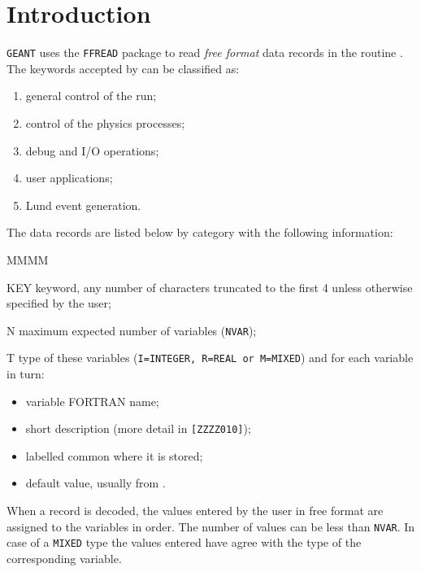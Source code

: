                
\section{ Introduction }
 
{\tt GEANT} uses the {\tt FFREAD} \cite{bib-FFREAD}
package to read {\it free format} data records in the routine .
The keywords accepted by  can be
classified as:
\begin{enumerate}
\item         general control of the run;
\item         control of the physics processes;
\item         debug and I/O operations;
\item         user applications;
\item         Lund event generation.
\end{enumerate}
 
The data records are listed below by category with the following information:
\begin{DLtt}{MMMM}
\item[KEY] keyword, any number of characters
truncated to the first 4 unless otherwise specified by the user;
\item[N] maximum expected number of variables ({\tt NVAR});
\item[T] type of these variables ({\tt I=INTEGER, R=REAL or M=MIXED})
and for each variable in turn:
\begin{itemize}
\item variable FORTRAN name;
\item short description (more detail in {\tt [ZZZZ010]});
\item labelled common where it is stored;
\item default value, usually from .
\end{itemize}
\end{DLtt}
When a record is decoded, the values entered by the user
in free format are assigned to the variables in order.
The number of values can be less than {\tt NVAR}. In case of a {\tt MIXED}
type the values entered have agree
with the type of the corresponding variable.
 
